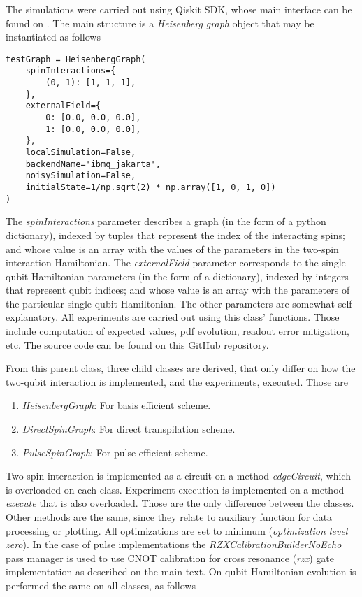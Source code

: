 The simulations were carried out using Qiskit SDK, whose main interface can be found on \cite{Qiskit}. The main structure is a \textit{Heisenberg graph} object that may be instantiated as follows

\begin{verbatim}
testGraph = HeisenbergGraph(
    spinInteractions={
        (0, 1): [1, 1, 1],
    },
    externalField={
        0: [0.0, 0.0, 0.0],
        1: [0.0, 0.0, 0.0],
    },
    localSimulation=False,
    backendName='ibmq_jakarta',
    noisySimulation=False,
    initialState=1/np.sqrt(2) * np.array([1, 0, 1, 0])
)
\end{verbatim}

The \textit{spinInteractions} parameter describes a graph (in the form of a python dictionary), indexed by tuples that represent the index of the interacting spins; and whose value is an array with the values of the parameters in the two-spin interaction Hamiltonian. The \textit{externalField} parameter corresponds to the single qubit Hamiltonian parameters (in the form of a dictionary), indexed by integers that represent qubit indices; and whose value is an array with the parameters of the particular single-qubit Hamiltonian. The other parameters are somewhat self explanatory. All experiments are carried out using this class' functions. Those include computation of expected values, pdf evolution, readout error mitigation, etc. The source code can be found on \href{https://github.com/DiegoHerrera262/Thesis2020/blob/refactor/PyHeisenberg/PyHeisenberg.py}{this GitHub repository}.

From this parent class, three child classes are derived, that only differ on how the two-qubit interaction is implemented, and the experiments, executed. Those are

\begin{enumerate}
    \item \textit{HeisenbergGraph}: For basis efficient scheme.
    \item \textit{DirectSpinGraph}: For direct transpilation scheme.
    \item \textit{PulseSpinGraph}: For pulse efficient scheme.
\end{enumerate}

Two spin interaction is implemented as a circuit on a method \textit{edgeCircuit}, which is overloaded on each class. Experiment execution is implemented on a method \textit{execute} that is also overloaded. Those are the only difference between the classes. Other methods are the same, since they relate to auxiliary function for data processing or plotting. All optimizations are set to minimum (\textit{optimization level zero}). In the case of pulse implementations the \textit{RZXCalibrationBuilderNoEcho} pass manager is used to use CNOT calibration for cross resonance (\textit{rzx}) gate implementation as described on the main text. On qubit Hamiltonian evolution is performed the same on all classes, as follows

